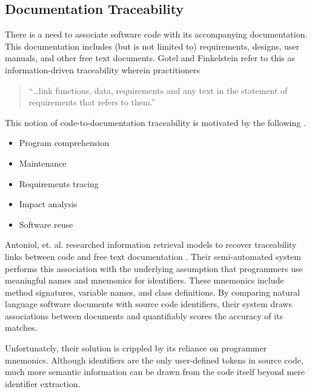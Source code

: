 \subsection{Documentation Traceability}
There is a need to associate software code with its accompanying documentation.
This documentation includes (but is not limited to) requirements, designs, user
manuals, and other free text documents. Gotel and Finkelstein refer to this as
information-driven traceability wherein practitioners
\begin{quote}
``\ldots link functions, data, requirements and any text in the statement of
requirements that refers to them.'' \cite{Gotel1994}
\end{quote}

This notion of code-to-documentation traceability is motivated by the following
\cite{Antoniol1999}.
\begin{itemize}
  \item Program comprehension
  \item Maintenance
  \item Requirements tracing
  \item Impact analysis
  \item Software reuse
\end{itemize}

Antoniol, et. al. researched information retrieval models to recover 
traceability links between code and free text documentation \cite{Antoniol1999,
Antoniol2000}. Their semi-automated system performs this association with the
underlying assumption that programmers use meaningful names and mnemonics for
identifiers. These mnemonics include method signatures, variable names, and
class definitions. By comparing natural language software documents with source
code identifiers, their system draws associations between documents and
quantifiably scores the accuracy of its matches.

Unfortunately, their solution is crippled by its reliance on programmer
mnemonics. Although identifiers are the only user-defined tokens in source
code, much more semantic information can be drawn from the code itself
beyond mere identifier extraction.


